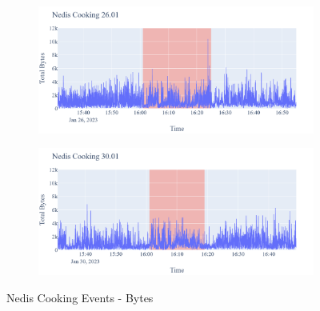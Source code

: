 \begin{figure}[H]
\begin{subfigure}[b]{0.5\textwidth}
        \centering
        \includegraphics[width=1.2\hsize]{figures/Nedis_Cooking_Bytes_26.01.png}
    \end{subfigure}
    \begin{subfigure}[b]{0.5\textwidth}
        \centering
        \includegraphics[width=1.2\hsize]{figures/Nedis_Cooking_Bytes_30.01.png}
    \end{subfigure}
    \caption{Nedis Cooking Events - Bytes}
    \label{fig:NedisCookingBytes}
\end{figure}

